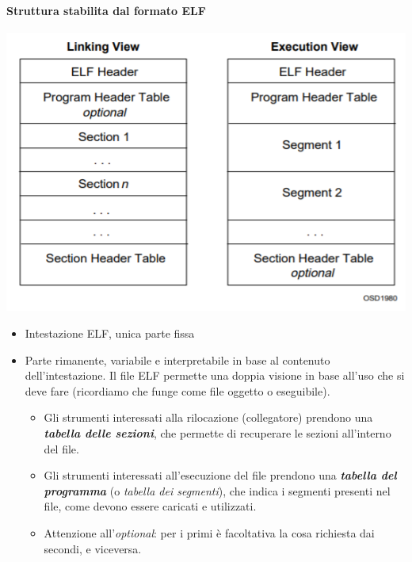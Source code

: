 \paragraph{Struttura stabilita dal formato ELF}\begin{center}
	\includegraphics[scale=0.8]{img/52.PNG}
\end{center}  
\begin{itemize}
	\item Intestazione ELF, unica parte fissa 
	\item Parte rimanente, variabile e interpretabile in base al contenuto dell'intestazione. Il file ELF permette una doppia visione in base all'uso che si deve fare (ricordiamo che funge come file oggetto o eseguibile).
	\begin{itemize}
		\item Gli strumenti interessati alla rilocazione (collegatore) prendono una \textbf{\emph{tabella delle sezioni}}, che permette di recuperare le sezioni all'interno del file.
		\item Gli strumenti interessati all'esecuzione del file prendono una \textbf{\emph{tabella del programma}} (o \emph{tabella dei segmenti}), che indica i segmenti presenti nel file, come devono essere caricati e utilizzati.
		\item Attenzione all'\emph{optional}: per i primi è facoltativa la cosa richiesta dai secondi, e viceversa.
	\end{itemize}
\end{itemize}
